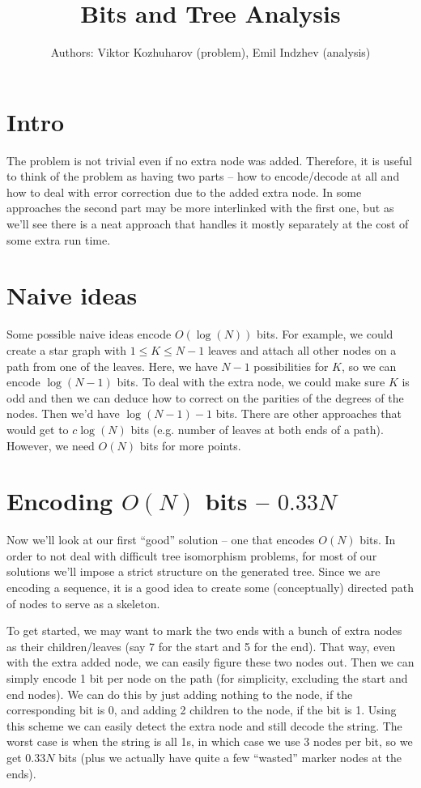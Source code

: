 \documentclass[12pt]{article}
\title{Bits and Tree Analysis}
\author{Authors: Viktor Kozhuharov (problem), Emil Indzhev (analysis)}
\date{}
\begin{document}
\maketitle

\section*{Intro}

The problem is not trivial even if no extra node was added. Therefore, it is useful to think of the problem as having two parts -- how to encode/decode at all and how to deal with error correction due to the added extra node. In some approaches the second part may be more interlinked with the first one, but as we'll see there is a neat approach that handles it mostly separately at the cost of some extra run time.

\section*{Naive ideas}

Some possible naive ideas encode $O(\log(N))$ bits. For example, we could create a star graph with $1 \leq K \leq N - 1$ leaves and attach all other nodes on a path from one of the leaves. Here, we have $N-1$ possibilities for $K$, so we can encode $\log(N-1)$ bits. To deal with the extra node, we could make sure $K$ is odd and then we can deduce how to correct on the parities of the degrees of the nodes. Then we'd have $\log(N-1) - 1$ bits. There are other approaches that would get to $c \log(N)$ bits (e.g. number of leaves at both ends of a path). However, we need $O(N)$ bits for more points.

\section*{Encoding $O(N)$ bits -- $0.33 N$}

Now we'll look at our first ``good'' solution -- one that encodes $O(N)$ bits. In order to not deal with difficult tree isomorphism problems, for most of our solutions we'll impose a strict structure on the generated tree. Since we are encoding a sequence, it is a good idea to create some (conceptually) directed path of nodes to serve as a skeleton.

To get started, we may want to mark the two ends with a bunch of extra nodes as their children/leaves (say 7 for the start and 5 for the end). That way, even with the extra added node, we can easily figure these two nodes out. Then we can simply encode 1 bit per node on the path (for simplicity, excluding the start and end nodes). We can do this by just adding nothing to the node, if the corresponding bit is 0, and adding 2 children to the node, if the bit is 1. Using this scheme we can easily detect the extra node and still decode the string. The worst case is when the string is all 1s, in which case we use 3 nodes per bit, so we get $0.33 N$ bits (plus we actually have quite a few ``wasted'' marker nodes at the ends).
\end{document}
